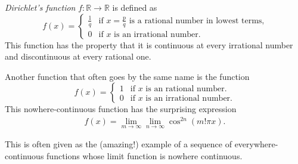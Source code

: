 \documentclass[12pt]{article}
\begin{document}
\emph{Dirichlet's function} $f:\mathbb{R}\to\mathbb{R}$ is defined as
\begin{displaymath}
  f\left(x\right) =
  \left\{ 
  \begin{array}{ll} 
    \frac{1}{q}  &  \textrm{if } x=\frac{p}{q}
                        \textrm{ is a rational number in lowest terms,} \\
    0              &  \textrm{if } x \textrm{ is an irrational number.} 
  \end{array}
  \right.
\end{displaymath}
This function has the property that it is continuous at every
irrational number and discontinuous at every rational one.

Another function that often goes by the same name is the function
\begin{displaymath}
  f\left(x\right) =
  \left\{ 
  \begin{array}{ll} 
    1  &  \textrm{if } x \textrm{ is an rational number.}\\
    0              &  \textrm{if } x \textrm{ is an irrational number.} 
  \end{array}
  \right.
\end{displaymath}
This nowhere-continuous function has the surprising  expression
\begin{align*}
f(x) = \lim_{m \to \infty} \lim_{n \to \infty} \cos^{2 n} (m! \pi x).
\end{align*}

This is often given as the (amazing!) example of a sequence of everywhere-continuous functions whose limit function is nowhere continuous.
\end{document}
